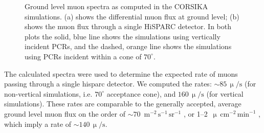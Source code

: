 \begin{figure}[ht!]
	\centering
	\qquad
	\caption{Ground level muon spectra as computed in the CORSIKA simulations. (a) shows the differential muon flux at ground level; (b) shows the muon flux through a single HiSPARC detector. In both plots the solid, blue line shows the simulations using vertically incident PCRs, and the dashed, orange line shows the simulations using PCRs incident within a cone of $70^{\circ}$.}
	\label{fig:CORSIKA_muon_spectra}
\end{figure}



The calculated spectra were used to determine the expected rate of muons passing through a single \gls{hisparc} detector. We computed the rates: $\sim 85 \, \upmu/\mathrm{s}$ (for non-vertical simulations, i.e. $70^\circ$ acceptance cone), and $160 \, \upmu/\mathrm{s}$ (for vertical simulations). These rates are comparable to the generally accepted, average ground level muon flux on the order of $\sim 70$~$\mathrm{m}^{-2}\,\mathrm{s}^{-1}\,\mathrm{sr}^{-1}$ \citep{cecchini_cosmic_2000, blackmore_terrestrial_2015, pereira_ground_2020, particle_data_group_review_2020}, or 1--2~$\upmu\,\mathrm{cm}^{-2}\,\mathrm{min}^{-1}$ \citep{particle_data_group_review_2020}, which imply a rate of $\sim140 \, \upmu/\mathrm{s}$. 

